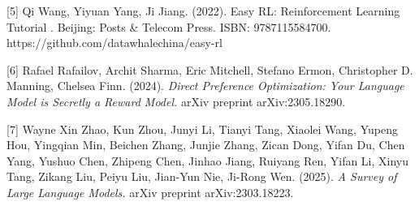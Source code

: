 \documentclass[
]{article}
\begin{document}
{[}5{]} Qi Wang, Yiyuan Yang, Ji Jiang. (2022). Easy RL: Reinforcement
Learning Tutorial . Beijing: Posts \& Telecom Press. ISBN:
9787115584700. https://github.com/datawhalechina/easy-rl

{[}6{]} Rafael Rafailov, Archit Sharma, Eric Mitchell, Stefano Ermon,
Christopher D. Manning, Chelsea Finn. (2024). \emph{Direct Preference
Optimization: Your Language Model is Secretly a Reward Model.} arXiv
preprint arXiv:2305.18290.

{[}7{]} Wayne Xin Zhao, Kun Zhou, Junyi Li, Tianyi Tang, Xiaolei Wang,
Yupeng Hou, Yingqian Min, Beichen Zhang, Junjie Zhang, Zican Dong, Yifan
Du, Chen Yang, Yushuo Chen, Zhipeng Chen, Jinhao Jiang, Ruiyang Ren,
Yifan Li, Xinyu Tang, Zikang Liu, Peiyu Liu, Jian-Yun Nie, Ji-Rong Wen.
(2025). \emph{A Survey of Large Language Models.} arXiv preprint
arXiv:2303.18223.
\end{document}
